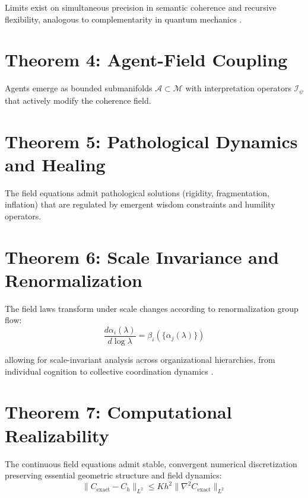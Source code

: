 Limits exist on simultaneous precision in semantic coherence and recursive flexibility, analogous to complementarity in quantum mechanics \autocite{Heisenberg1927}.

\section{Theorem 4: Agent-Field Coupling}
Agents emerge as bounded submanifolds \(\mathcal{A} \subset \mathcal{M}\) with interpretation operators \(\mathcal{I}_{\psi}\) that actively modify the coherence field.

\section{Theorem 5: Pathological Dynamics and Healing}
The field equations admit pathological solutions (rigidity, fragmentation, inflation) that are regulated by emergent wisdom constraints and humility operators.

\section{Theorem 6: Scale Invariance and Renormalization}
The field laws transform under scale changes according to renormalization group flow:
\begin{equation}
\frac{d\alpha_i(\lambda)}{d\log\lambda} = \beta_i(\{\alpha_j(\lambda)\})
\end{equation}

allowing for scale-invariant analysis across organizational hierarchies, from individual cognition to collective coordination dynamics \autocite{Wilson1971}.

\section{Theorem 7: Computational Realizability}
The continuous field equations admit stable, convergent numerical discretization preserving essential geometric structure and field dynamics:
\begin{equation}
\|C_{\text{exact}} - C_h\|_{L^2} \leq K h^2 \|\nabla^2 C_{\text{exact}}\|_{L^2}
\end{equation} 